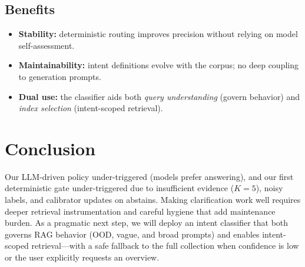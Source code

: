 \documentclass[11pt]{article}
\begin{document}
\subsection{Benefits}
\begin{itemize}[leftmargin=1.25em]
  \item \textbf{Stability:} deterministic routing improves precision without relying on model self-assessment.
  \item \textbf{Maintainability:} intent definitions evolve with the corpus; no deep coupling to generation prompts.
  \item \textbf{Dual use:} the classifier aids both \emph{query understanding} (govern behavior) and \emph{index selection} (intent-scoped retrieval).
\end{itemize}

\section{Conclusion}
Our LLM-driven policy under-triggered (models prefer answering), and our first deterministic gate under-triggered due to insufficient evidence ($K{=}5$), noisy labels, and calibrator updates on abstains. Making clarification work well requires deeper retrieval instrumentation and careful hygiene that add maintenance burden. As a pragmatic next step, we will deploy an intent classifier that both governs RAG behavior (OOD, vague, and broad prompts) and enables intent-scoped retrieval---with a safe fallback to the full collection when confidence is low or the user explicitly requests an overview.
\end{document}
